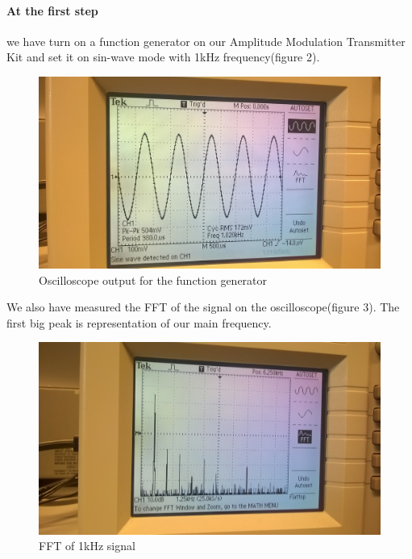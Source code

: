\documentclass[english]{article}
\begin{document}
\paragraph{At the first step} we have turn on a function generator on our Amplitude Modulation Transmitter Kit and set it on sin-wave mode with 1kHz frequency(figure 2).
\begin{figure}[H]
\centerline{\includegraphics[scale=0.1]{AM/1AM_In}}
\caption{Oscilloscope output for the function generator}
\end{figure}
We also have measured the FFT of the signal on the oscilloscope(figure 3). The first big peak is representation of our main frequency.
\begin{figure}[H]
\centerline{\includegraphics[scale=0.1]{AM/2IN_FFT}}
\caption{FFT of 1kHz signal}
\end{figure}
\end{document}
